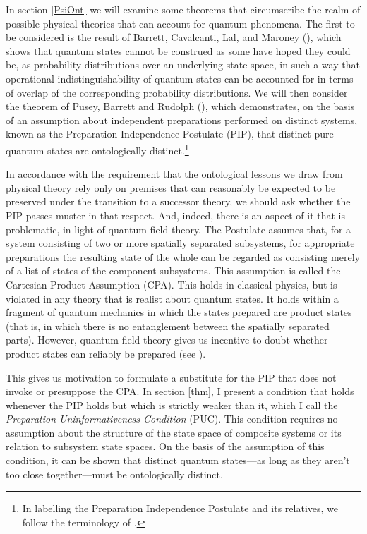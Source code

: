 \documentclass[12pt]{article}
\begin{document}
In section \ref{PsiOnt} we will examine some theorems that circumscribe the realm of possible physical theories that can account for quantum phenomena.  The first to be considered is the result of Barrett, Cavalcanti, Lal, and Maroney (\citeyear{BCLM}), which shows that quantum states cannot be construed as some have hoped they could be, as probability distributions over an underlying state space, in such a way that operational indistinguishability of quantum states can be accounted for in terms of overlap of the corresponding probability distributions.  We will then consider the \emph{  }theorem of Pusey, Barrett and Rudolph (\citeyear{PBR}), which demonstrates, on the basis of an assumption about independent preparations performed on distinct systems, known as the Preparation Independence Postulate (PIP), that distinct pure quantum states are ontologically distinct.\footnote{In labelling the Preparation Independence Postulate and its relatives, we follow the terminology of \citet{LeiferPsiOnt}.}

In accordance with the requirement that the ontological lessons we draw from physical theory  rely only on premises that can reasonably be expected to be preserved under the transition to a successor theory, we should ask  whether the PIP passes muster in that respect.  And, indeed, there is an aspect of it that is problematic, in light of quantum field theory. The Postulate assumes that, for a system consisting of two or more spatially separated subsystems,  for appropriate preparations the resulting state of the whole can be regarded as consisting merely of a list of states of the component subsystems.  This assumption is called the Cartesian Product Assumption (CPA).  This holds in classical physics, but is violated  in any theory that is realist about quantum states.  It holds within a fragment of quantum mechanics in which the states prepared are product states (that is, in which there is no entanglement between the spatially separated parts).  However, quantum field theory gives us  incentive to doubt whether product states can reliably be prepared (see \citealt{EntangOpenSystems}).

This gives us motivation to formulate a substitute for the PIP that does not invoke or presuppose the CPA.  In  section \ref{thm}, I present a condition that holds whenever the PIP holds but which is strictly weaker than it, which I call the  \emph{Preparation Uninformativeness Condition} (PUC).  This condition requires no assumption about the structure of the state space of composite systems or its relation to subsystem state spaces.  On the basis of the assumption of this condition, it can be shown that distinct quantum states---as long as they aren't too close together---must be ontologically distinct.
\end{document}
